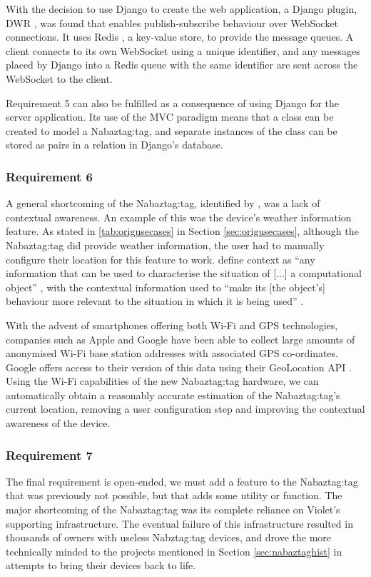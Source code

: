 \documentclass[12pt, a4paper]{article}
\begin{document}
\vspace{-15pt}

With the decision to use Django to create the web application, a Django plugin, \ac{DWR} \parencite{djangowsredis}, was found that enables publish-subscribe behaviour over WebSocket connections. It uses Redis \parencite{redis}, a key-value store, to provide the message queues. A client connects to its own WebSocket using a unique identifier, and any messages placed by Django into a Redis queue with the same identifier are sent across the WebSocket to the client.

Requirement 5 can also be fulfilled as a consequence of using Django for the server application. Its use of the \ac{MVC} paradigm means that a class can be created to model a Nabaztag:tag, and separate instances of the class can be stored as pairs in a relation in Django's database.

\subsubsection{Requirement 6}
A general shortcoming of the Nabaztag:tag, identified by \citeauthor{Huang2011} \parencite{Huang2011}, was a lack of contextual awareness. An example of this was the device's weather information feature. As stated in \autoref{tab:origusecases} in Section \ref{sec:origusecases}, although the Nabaztag:tag did provide weather information, the user had to manually configure their location for this feature to work. \citeauthor{Abowd1999} define context as ``any information that can be used to characterise the situation of [...] a computational object'' \parencite{Abowd1999}, with the contextual information used to ``make its [the object's] behaviour more relevant to the situation in which it is being used'' \parencite{Abowd1999}.

With the advent of smartphones offering both Wi-Fi and \ac{GPS} technologies, companies such as Apple and Google have been able to collect large amounts of anonymised Wi-Fi base station addresses with associated \ac{GPS} co-ordinates. Google offers access to their version of this data using their GeoLocation API \parencite{googlegeo}. Using the Wi-Fi capabilities of the new Nabaztag:tag hardware, we can automatically obtain a reasonably accurate estimation of the Nabaztag:tag's current location, removing a user configuration step and improving the contextual awareness of the device.

\subsubsection{Requirement 7}\label{sec:require7}
The final requirement is open-ended, we must add a feature to the Nabaztag:tag that was previously not possible, but that adds some utility or function. The major shortcoming of the Nabaztag:tag was its complete reliance on Violet's supporting infrastructure. The eventual failure of this infrastructure resulted in thousands of owners with useless Nabztag:tag devices, and drove the more technically minded to the projects mentioned in Section \ref{sec:nabaztaghist} in attempts to bring their devices back to life.
\end{document}

